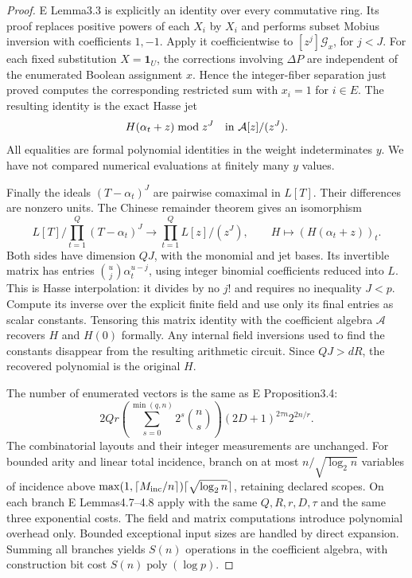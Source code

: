 \begin{proof}
E Lemma3.3 is explicitly an identity over every commutative ring. Its proof replaces positive powers of each $X_i$ by $X_i$ and performs subset Mobius inversion with coefficients $1,-1$. Apply it coefficientwise to $[z^j]\mathcal G_x$, for $j<J$. For each fixed substitution $X=\mathbf1_U$, the corrections involving $\Delta P$ are independent of the enumerated Boolean assignment $x$. Hence the integer-fiber separation just proved computes the corresponding restricted sum with $x_i=1$ for $i\in E$. The resulting identity is the exact Hasse jet
\[
                      H(\alpha_t+z)\bmod z^J
                         \quad\hbox{in }\mathcal A[z]/(z^J).
\]
All equalities are formal polynomial identities in the weight indeterminates $y$. We have not compared numerical evaluations at finitely many $y$ values.

Finally the ideals $(T-\alpha_t)^J$ are pairwise comaximal in $L[T]$. Their differences are nonzero units. The Chinese remainder theorem gives an isomorphism
\[
 L[T]\big/\!\prod_{t=1}^Q(T-\alpha_t)^J
              \longrightarrow\prod_{t=1}^Q L[z]/(z^J),
       \qquad H\longmapsto(H(\alpha_t+z))_t.
\]
Both sides have dimension $QJ$, with the monomial and jet bases. Its invertible matrix has entries
$\binom uj\alpha_t^{u-j}$, using integer binomial coefficients reduced into $L$. This is Hasse interpolation: it divides by no $j!$ and requires no inequality $J<p$. Compute its inverse over the explicit finite field and use only its final entries as scalar constants. Tensoring this matrix identity with the coefficient algebra $\mathcal A$ recovers $H$ and $H(0)$ formally. Any internal field inversions used to find the constants disappear from the resulting arithmetic circuit. Since $QJ>dR$, the recovered polynomial is the original $H$.

The number of enumerated vectors is the same as E Proposition3.4:
\[
 2Qr\left(\sum_{s=0}^{\min(q,n)}2^s\binom ns\right)
                       (2D+1)^{2\tau n}2^{2n/r}.
\]
The combinatorial layouts and their integer measurements are unchanged. For bounded arity and linear total incidence, branch on at most $n/\sqrt{\log_2n}$ variables of incidence above
$\max(1,\lceil M_{\rm inc}/n\rceil)\lceil\sqrt{\log_2n}\rceil$, retaining declared scopes. On each branch E Lemmas4.7--4.8 apply with the same $Q,R,r,D,\tau$ and the same three exponential costs. The field and matrix computations introduce polynomial overhead only. Bounded exceptional input sizes are handled by direct expansion. Summing all branches yields $S(n)$ operations in the coefficient algebra, with construction bit cost $S(n)\operatorname{poly}(\log p)$.


\end{proof}
